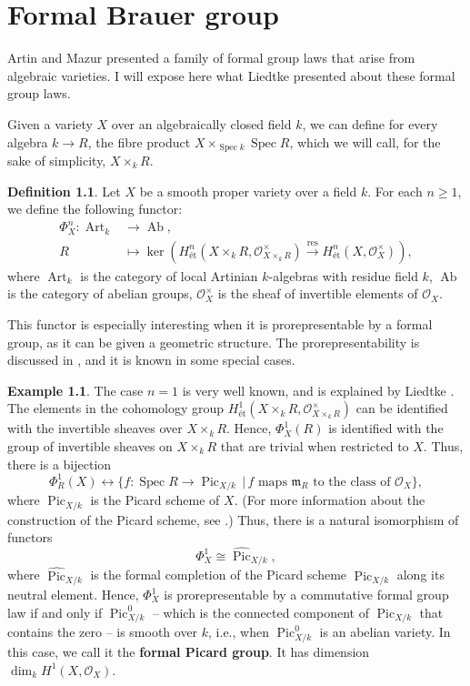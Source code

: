 \documentclass{report}
\DeclareMathOperator{\Spec}{Spec}
\DeclareMathOperator{\Art}{Art}
\DeclareMathOperator{\Ab}{Ab}
\DeclareMathOperator{\Pic}{Pic}
\theoremstyle{definition}
\newtheorem{definition}[theorem]{Definition}
\newtheorem{example}[theorem]{Example}
\begin{document}
\chapter{Formal Brauer group}
\label{Cha:formal-brauer-group}

Artin and Mazur \cite{artin1977formal} presented a family of formal group laws that arise from algebraic varieties. I will expose here what Liedtke \cite[Section~6.2]{liedtke2016lectures} presented about these formal group laws.

Given a variety $X$ over an algebraically closed field $k$, we can define for every algebra $k\rightarrow R$, the fibre product $X\times_{\Spec k}\Spec R$, which we will call, for the sake of simplicity, $X\times_kR$.

\begin{definition}
Let $X$ be a smooth proper variety over a field $k$. For each $n\geq1$, we define the following functor:
\begin{align*}
\Phi_X^n:\Art_k&\longrightarrow\Ab,\\
R&\longmapsto\ker\left(H_{\text{\'{e}t}}^n(X\times_kR,\mathcal{O}_{X\times_kR}^{\times})\xrightarrow{\text{res}}H_{\text{\'{e}t}}^n(X,\mathcal{O}_X^{\times})\right),
\end{align*}
where $\Art_k$ is the category of local Artinian $k$-algebras with residue field $k$, $\Ab$ is the category of abelian groups, $\mathcal{O}_X^{\times}$ is the sheaf of invertible elements of $\mathcal{O}_X$.
\end{definition}

This functor is especially interesting when it is prorepresentable by a formal group, as it can be given a geometric structure. The prorepresentability is discussed in \cite{artin1977formal}, and it is known in some special cases.

\begin{example}
The case $n=1$ is very well known, and is explained by Liedtke \cite[Example~6.14]{liedtke2016lectures}. The elements in the cohomology group $H_{\text{\'{e}t}}^1(X\times_kR,\mathcal{O}_{X\times_kR}^{\times})$ can be identified with the invertible sheaves over $X\times_kR$. Hence, $\Phi_X^1(R)$ is identified with the group of invertible sheaves on $X\times_kR$ that are trivial when restricted to $X$. Thus, there is a bijection
\[\Phi_R^1(X)\longleftrightarrow\{f:\Spec R\rightarrow\Pic_{X/k}\,|\,f\text{ maps }\mathfrak{m}_R\text{ to the class of }\mathcal{O}_X\},\]
where $\Pic_{X/k}$ is the Picard scheme of $X$. (For more information about the construction of the Picard scheme, see \cite{kleiman2005picard}.) Thus, there is a natural isomorphism of functors
\[\Phi_X^1\cong\widehat{\Pic}_{X/k},\]
where $\widehat{\Pic}_{X/k}$ is the formal completion of the Picard scheme $\Pic_{X/k}$ along its neutral element. Hence, $\Phi_X^1$ is prorepresentable by a commutative formal group law if and only if $\Pic_{X/k}^0$ -- which is the connected component of $\Pic_{X/k}$ that contains the zero -- is smooth over $k$, i.e., when $\Pic_{X/k}^0$ is an abelian variety. In this case, we call it the \textbf{formal Picard group}. It has dimension $\dim_kH^1(X,\mathcal{O}_X)$.
\end{example}
\end{document}
